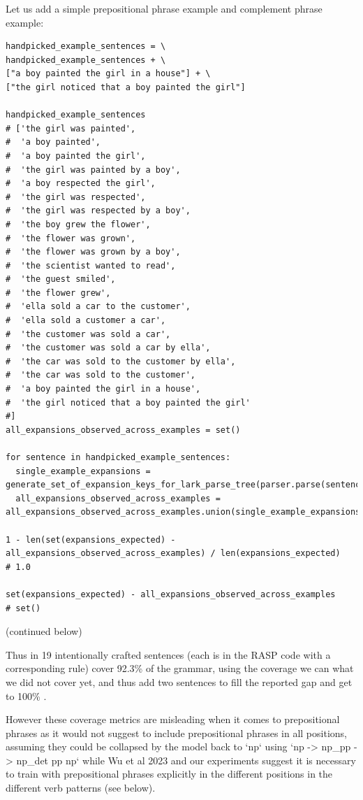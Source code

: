 \documentclass[11pt]{article}
\begin{document}
Let us add a simple prepositional phrase example and complement phrase example:
\begin{tiny}
\begin{verbatim}
handpicked_example_sentences = \
handpicked_example_sentences + \
["a boy painted the girl in a house"] + \
["the girl noticed that a boy painted the girl"]

handpicked_example_sentences
# ['the girl was painted',
#  'a boy painted',
#  'a boy painted the girl',
#  'the girl was painted by a boy',
#  'a boy respected the girl',
#  'the girl was respected',
#  'the girl was respected by a boy',
#  'the boy grew the flower',
#  'the flower was grown',
#  'the flower was grown by a boy',
#  'the scientist wanted to read',
#  'the guest smiled',
#  'the flower grew',
#  'ella sold a car to the customer',
#  'ella sold a customer a car',
#  'the customer was sold a car',
#  'the customer was sold a car by ella',
#  'the car was sold to the customer by ella',
#  'the car was sold to the customer',
#  'a boy painted the girl in a house',
#  'the girl noticed that a boy painted the girl'
#]
all_expansions_observed_across_examples = set()

for sentence in handpicked_example_sentences:
  single_example_expansions = generate_set_of_expansion_keys_for_lark_parse_tree(parser.parse(sentence.lower()))
  all_expansions_observed_across_examples = all_expansions_observed_across_examples.union(single_example_expansions)

1 - len(set(expansions_expected) - all_expansions_observed_across_examples) / len(expansions_expected)
# 1.0

set(expansions_expected) - all_expansions_observed_across_examples
# set()
\end{verbatim}
\end{tiny}
(continued below)
\clearpage

Thus in 19 intentionally crafted sentences (each is in the RASP code with a corresponding rule) cover 92.3\% of the grammar, 
using the coverage we can what we did not cover yet, and thus add two sentences to fill the reported gap and get to 100\% .

However these coverage metrics are misleading when it comes to prepositional phrases as it would not suggest to include prepositional phrases in all positions, assuming they could be collapsed by the model back to `np` using `np -> np\_pp -> np\_det pp np` while Wu et al 2023 and our experiments suggest it is necessary to train with prepositional phrases explicitly in the different positions in the different verb patterns (see below).
\end{document}
